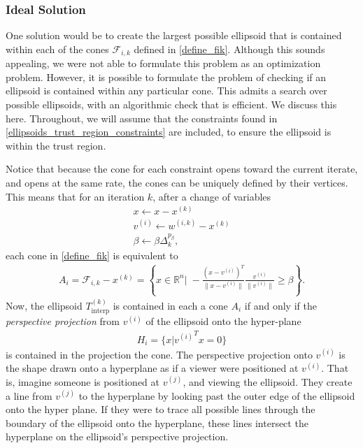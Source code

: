 \documentclass{article}
\theoremstyle{case}
\numberwithin{theorem}{subsection}
\newcommand{\dk}{\Delta_k}
\newcommand{\fik}{{\mathcal F_{i, k}}}
\newcommand{\Rn}{\mathbb R^n}
\newcommand{\sampletrk}{{T_{\text{interp}}^{(k)}}}
\newcommand{\wik}{{w^{(i, k)}}}
\newcommand{\xk}{{x^{(k)}}}
\begin{document}
\subsubsection{Ideal Solution}
\label{ideal_ellipsoid_in_polyhedron}

One solution would be to create the largest possible ellipsoid that is contained within each of the cones $\fik$ defined in \cref{define_fik}.
Although this sounds appealing, we were not able to formulate this problem as an optimization problem.
However, it is possible to formulate the problem of checking if an ellipsoid is contained within any particular cone.
This admits a search over possible ellipsoids, with an algorithmic check that is efficient.
We discuss this here.
Throughout, we will assume that the constraints found in \cref{ellipsoids_trust_region_constraints} are included, to ensure the ellipsoid is within the trust region.

Notice that because the cone for each constraint opens toward the current iterate, and opens at the same rate, the cones can be uniquely defined by their vertices.
This means that for an iteration $k$, after a change of variables
\begin{align}
x \gets x - \xk \\
v^{(i)}  \gets \wik - \xk \\
\beta \gets \beta \dk^{p_{\beta}},
\end{align}
each cone in \cref{define_fik} is equivalent to
\begin{align*}
A_i = \fik - \xk = \left\{x\in\Rn\bigg|\;-\frac{(x - v^{(i)})^T}{\|x - v^{(i)}\|} \frac{v^{(i)}}{\|v^{(i)}\|} \ge \beta \right\}.
\end{align*}
Now, the ellipsoid $\sampletrk$ is contained in each a cone $A_i$ if and only if the \emph{perspective projection} from $v^{(i)}$ of the ellipsoid onto the hyper-plane 
\begin{align*}
H_i = \{x|{v^{(i)}}^Tx = 0\}
\end{align*}
is contained in the projection the cone.
The perspective projection onto $v^{(i)}$ is the shape drawn onto a hyperplane as if a viewer were positioned at $v^{(i)}$.
That is, imagine someone is positioned at $v^{(j)}$, and viewing the ellipsoid.
They create a line from $v^{(j)}$ to the hyperplane by looking past the outer edge of the ellipsoid onto the hyper plane.
If they were to trace all possible lines through the boundary of the ellipsoid onto the hyperplane, these lines intersect the hyperplane on the ellipsoid's perspective projection.
\end{document}
